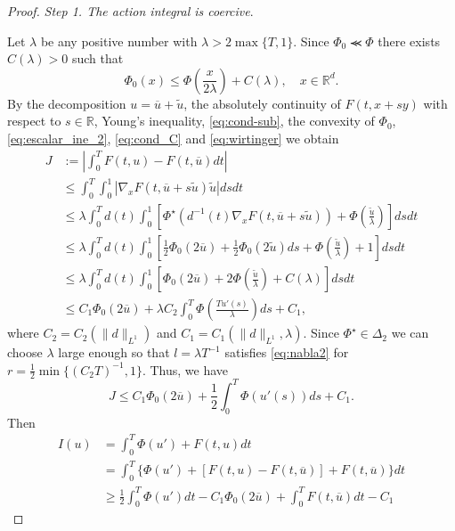 \documentclass[twoside]{article}
\theoremstyle{remark}
\newcommand{\rr}{\mathbb{R}}
\renewcommand{\leq}{\leqslant}
\renewcommand{\geq}{\geqslant}
\begin{document}
\begin{proof} \emph{Step 1. The action integral is coercive}.
 
  
  Let $\lambda$ be any positive number with $\lambda>2\max\{T,1\}$. Since $\Phi_0\llcurly \Phi$ there exists $C(\lambda)>0$ such that 
  \begin{equation}\label{eq:cond_C}
    \Phi_0(x)\leq \Phi\left(\frac{x}{2\lambda}\right)+C(\lambda),\quad  x\in\rr^d. 
  \end{equation}
By the decomposition $u=\overline{u}+\tilde{u}$, the absolutely continuity of $F(t,x+sy)$ with respect to $s\in\rr$,  Young's inequality, \eqref{eq:cond-sub}, the convexity of $\Phi_0$, \ref{eq:escalar_ine_2}, \eqref{eq:cond_C} and \eqref{eq:wirtinger}  we obtain
\begin{equation*}\label{eq:cota-dif-F}
\begin{split}
J&:=\left|\int_0^T F(t,u)-F(t,\overline{u})dt\right|
\\
&\leq \int_0^T \int_0^1 |\nabla_x F(t,\overline{u}+s\tilde{u})\tilde{u}|dsdt
\\
&\leq
\lambda \int_0^T d(t) \int_0^1 \left[ \Phi^{\star}\left(d^{-1}(t)\nabla_xF(t,\overline{u}+s\tilde{u})\right)+\Phi\left(\frac{\tilde{u}}{\lambda}\right)\right]dsdt
\\
&\leq
\lambda\int_0^T d(t)\int_0^1\left[ \frac12\Phi_0(2\overline{u})+\frac12\Phi_0(2\tilde{u})ds+\Phi\left(\frac{\tilde{u}}{\lambda}\right)+1 \right]dsdt
\\
&\leq
\lambda\int_0^T d(t)\int_0^1\left[ \Phi_0(2\overline{u})+2\Phi\left(\frac{\tilde{u}}{\lambda}\right)+C(\lambda) \right]dsdt
\\
&\leq C_1 \Phi_0(2\overline{u})+\lambda C_2 \int_0^T \Phi\left(\frac{Tu'(s)}{\lambda}\right)ds+C_1,
\end{split}
\end{equation*}
where $C_2=C_2(\|d\|_{L^1})$ and $C_1=C_1(\|d\|_{L^1},\lambda)$.  Since $\Phi^{\star} \in \Delta_2$ we can choose $\lambda$ large enough so that $l=\lambda T^{-1}$ satisfies  \eqref{eq:nabla2} for $r=\frac12 \min\{(C_2T)^{-1},1\}$. Thus, we have
\[
 J\leq C_1 \Phi_0(2\overline{u})+\frac12 \int_0^T \Phi\left(u'(s)\right)ds+C_1.
\]
Then
\begin{equation}
\begin{split}
I(u)&=\int_0^T  \Phi(u')+F(t,u)dt\\
&= \int_0^T \{\Phi(u')+[F(t,u)-F(t,\overline{u})]+F(t,\overline{u})\}dt
\\
&\geq
\frac12\int_0^T \Phi(u')dt-C_1\Phi_0(2 \overline{u})+\int_0^T F(t,\overline{u})dt-C_1
\end{split}
\end{equation}


\end{proof}
\end{document}
